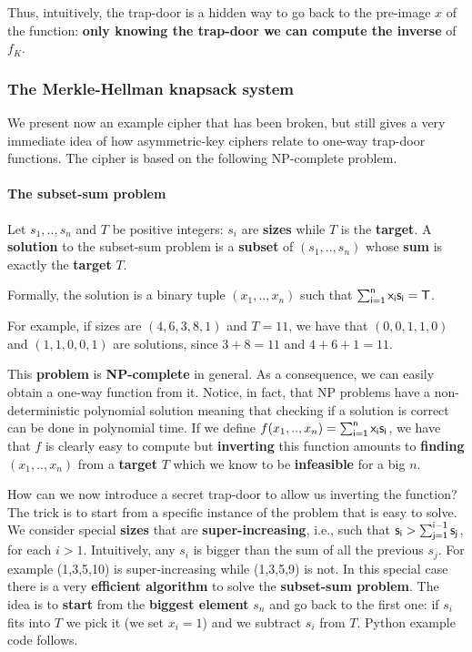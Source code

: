 Thus, intuitively, the trap-door is a hidden way to go back to the pre-image $x$ of the function: \textbf{only knowing the trap-door we can compute the inverse} of $f_K$.

\subsubsection{The Merkle-Hellman knapsack system}
We present now an example cipher that has been broken, but still gives a very immediate idea of how asymmetric-key ciphers relate to one-way trap-door functions. The cipher is based on the following NP-complete problem.

\paragraph{The subset-sum problem} 
Let $s_1, .., s_n$ and $T$ be positive integers: $s_i$ are \textbf{sizes} while $T$ is the \textbf{target}. A \textbf{solution} to the subset-sum problem is a \textbf{subset} of $(s_1, .., s_n)$ whose \textbf{sum} is exactly the \textbf{target} $T$. 

Formally, the solution is a binary tuple $(x_1, .., x_n)$ such that $\sf\sum_{i=1}^{n}{} x_i s_i = T$.


For example, if sizes are $(4,6,3,8,1)$ and $T=11$, we have that $(0,0,1,1,0)$ and $(1,1,0,0,1)$ are solutions, since $3+8 = 11$ and $4+6+1 = 11$.

This \textbf{problem} is \textbf{NP-complete} in general. As a consequence, we can easily obtain a one-way function from it. Notice, in fact, that NP problems have a non-deterministic polynomial solution meaning that checking if a solution is correct can be done in polynomial time. If we define $f(x_1, .., x_n) = \sf\sum_{i=1}^{n}{} x_i s_i$, we have that $f$ is clearly easy to compute but \textbf{inverting} this function amounts to \textbf{finding} $(x_1, .., x_n)$ from a \textbf{target} $T$ which we know to be \textbf{infeasible} for a big $n$.

How can we now introduce a secret trap-door to allow us inverting the function? The trick is to start from a specific instance of the problem that is easy to solve. We consider special \textbf{sizes} that are \textbf{super-increasing}, i.e., such that $\sf s_i > \sum_{j=1}^{i-1} s_j$, for each $i>1$. Intuitively, any $s_i$ is bigger than the sum of all the previous $s_j$. For example (1,3,5,10) is super-increasing while (1,3,5,9) is not. In this special case there is a very \textbf{efficient algorithm} to solve the \textbf{subset-sum problem}. The idea is to \textbf{start} from the \textbf{biggest element} $s_n$ and go back to the first one: if $s_i$ fits into $T$ we pick it (we set $x_i=1$) and we subtract $s_i$ from $T$. Python example code follows.

